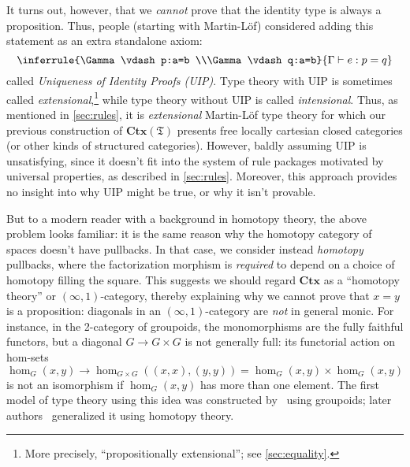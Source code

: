 \documentclass[10pt]{article}
\def\oo{\ensuremath{\infty}}
\def\io{\ensuremath{(\oo,1)}}
\def\ty{\;\mathsf{type}}
\def\types{\vdash}
\def\Ctx{\mathbf{Ctx}}
\def\fT{\mathfrak{T}}
\def\CtxT{\mathbf{Ctx}(\fT)}
\numberwithin{equation}{section}
\begin{document}
It turns out, however, that we \emph{cannot} prove that the identity type is always a proposition.
Thus, people (starting with Martin-L\"{o}f) considered adding this statement as an extra standalone axiom:
\begin{equation}
  \inferrule{%
    \Gamma\types p:a=b \\\Gamma\types q:a=b}{\Gamma\types e:p=q}\label{eq:uip}
\end{equation}
called \emph{Uniqueness of Identity Proofs (UIP)}.
Type theory with UIP is sometimes called \emph{extensional},\footnote{More precisely, ``propositionally extensional''; see \cref{sec:equality}.} while type theory without UIP is called \emph{intensional}.
Thus, as mentioned in \cref{sec:rules}, it is \emph{extensional} Martin-L\"{o}f type theory for which our previous construction of $\CtxT$ presents free locally cartesian closed categories (or other kinds of structured categories).
%
However, baldly assuming UIP is unsatisfying, since it doesn't fit into the system of rule packages motivated by universal properties, as described in \cref{sec:rules}.
Moreover, this approach provides no insight into why UIP might be true, or why it isn't provable.

But to a modern reader with a background in homotopy theory, the above problem looks familiar: it is the same reason why the homotopy category of spaces doesn't have pullbacks.
In that case, we consider instead \emph{homotopy} pullbacks, where the factorization morphism is \emph{required} to depend on a choice of homotopy filling the square.
This suggests we should regard $\Ctx$ as a ``homotopy theory'' or $\io$-category, thereby explaining why we cannot prove that $x=y$ is a proposition: diagonals in an $\io$-category are \emph{not} in general monic.
For instance, in the 2-category of groupoids, the monomorphisms are the fully faithful functors, but a diagonal $G\to G\times G$ is not generally full: its functorial action on hom-sets
\[\hom_G(x,y) \longrightarrow \hom_{G\times G}((x,x),(y,y)) = \hom_G(x,y) \times \hom_G(x,y)\]
is not an isomorphism if $\hom_G(x,y)$ has more than one element.
The first model of type theory using this idea was constructed by~\cite{hs:gpd-typethy} using groupoids; later authors~\cite{aw:htpy-idtype,klv:ssetmodel} generalized it using homotopy theory.
\end{document}
